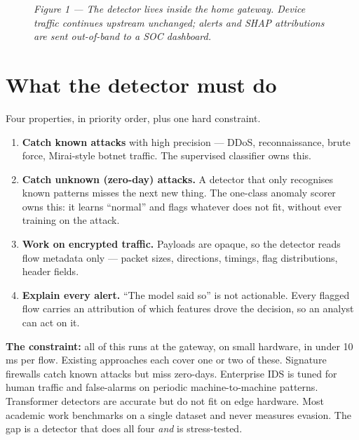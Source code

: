 \documentclass[11pt,a4paper]{article}
\begin{document}
\begin{figure}[H]
\caption*{\small\textit{Figure 1 --- The detector lives inside the home gateway. Device traffic continues upstream unchanged; alerts and SHAP attributions are sent out-of-band to a SOC dashboard.}}
\end{figure}

\section{What the detector must do}

Four properties, in priority order, plus one hard constraint.

\begin{enumerate}[leftmargin=*, itemsep=3pt]
  \item \textbf{Catch known attacks} with high precision --- DDoS, reconnaissance, brute force, Mirai-style botnet traffic. The supervised classifier owns this.
  \item \textbf{Catch unknown (zero-day) attacks.} A detector that only recognises known patterns misses the next new thing. The one-class anomaly scorer owns this: it learns ``normal'' and flags whatever does not fit, without ever training on the attack.
  \item \textbf{Work on encrypted traffic.} Payloads are opaque, so the detector reads flow metadata only --- packet sizes, directions, timings, flag distributions, header fields.
  \item \textbf{Explain every alert.} ``The model said so'' is not actionable. Every flagged flow carries an attribution of which features drove the decision, so an analyst can act on it.
\end{enumerate}

\textbf{The constraint:} all of this runs at the gateway, on small hardware, in under 10\,ms per flow. Existing approaches each cover one or two of these. Signature firewalls catch known attacks but miss zero-days. Enterprise IDS is tuned for human traffic and false-alarms on periodic machine-to-machine patterns. Transformer detectors are accurate but do not fit on edge hardware. Most academic work benchmarks on a single dataset and never measures evasion. The gap is a detector that does all four \emph{and} is stress-tested.
\end{document}
